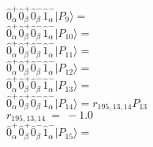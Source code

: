 \documentclass[14pt]{article}
\begin{document}
    $ \hat{0}_{\alpha}^{+}\hat{0}_{\beta}^{+}\hat{0}_{\beta}^{-}\hat{1}_{\alpha}^{-} \vert{P_{9}}\rangle =  $ \\ 
    $ \hat{0}_{\alpha}^{+}\hat{0}_{\beta}^{+}\hat{0}_{\beta}^{-}\hat{1}_{\alpha}^{-} \vert{P_{10}}\rangle =  $ \\ 
    $ \hat{0}_{\alpha}^{+}\hat{0}_{\beta}^{+}\hat{0}_{\beta}^{-}\hat{1}_{\alpha}^{-} \vert{P_{11}}\rangle =  $ \\ 
    $ \hat{0}_{\alpha}^{+}\hat{0}_{\beta}^{+}\hat{0}_{\beta}^{-}\hat{1}_{\alpha}^{-} \vert{P_{12}}\rangle =  $ \\ 
    $ \hat{0}_{\alpha}^{+}\hat{0}_{\beta}^{+}\hat{0}_{\beta}^{-}\hat{1}_{\alpha}^{-} \vert{P_{13}}\rangle =  $ \\ 
    $ \hat{0}_{\alpha}^{+}\hat{0}_{\beta}^{+}\hat{0}_{\beta}^{-}\hat{1}_{\alpha}^{-} \vert{P_{14}}\rangle = {r}_{195,13,14}P_{13} $ \\ 
    ${r}_{195,13,14}\ =\ -1.0 $ \\ 
    $ \hat{0}_{\alpha}^{+}\hat{0}_{\beta}^{+}\hat{0}_{\beta}^{-}\hat{1}_{\alpha}^{-} \vert{P_{15}}\rangle =  $ \\ 
    
\end{document}
